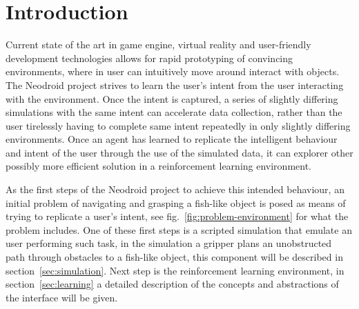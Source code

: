 \section{Introduction}




Current state of the art in game engine, virtual reality and user-friendly development technologies allows for rapid prototyping of convincing environments, where in user can intuitively move around interact with objects. The Neodroid project strives to learn the user's intent from the user interacting with the environment. Once the intent is captured, a series of slightly differing simulations with the same intent can accelerate data collection, rather than the user tirelessly having to complete same intent repeatedly in only slightly differing environments. 
Once an agent has learned to replicate the intelligent behaviour and intent of the user through the use of the simulated data, it can explorer other possibly more efficient solution in a reinforcement learning environment.

As the first steps of the Neodroid project to achieve this intended behaviour, an initial problem of navigating and grasping a fish-like object is posed as means of trying to replicate a user's intent, see fig.~\ref{fig:problem-environment} for what the problem includes. One of these first steps is a scripted simulation that emulate an user performing such task, in the simulation a gripper plans an unobstructed path through obstacles to a fish-like object, this component will be described in section~\ref{sec:simulation}. Next step is the reinforcement learning environment, in section~\ref{sec:learning} a detailed description of the concepts and abstractions of the interface will be given.

